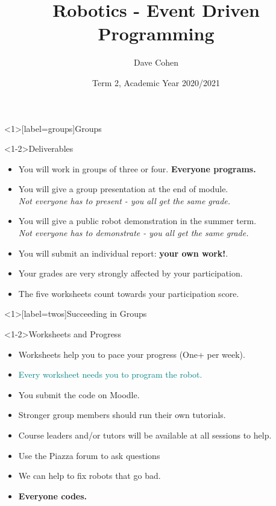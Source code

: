 \documentclass[color=pdftex,usenames,dvipsnames, aspectratio=169]{beamer}
\title{Robotics - Event Driven Programming}
\author{Dave Cohen}
\institute[Comp. Sci., RHUL]{Computer Science, Royal Holloway, University of London}
\date[Term 2, 2020/2021]{Term 2, Academic Year 2020/2021}
\begin{document}
\begin{frame}
  \titlepage
\end{frame}


\begin{frame}<1>[label=groups]{Groups}
\begin{block}<1-2>{Deliverables}
\begin{itemize}
\item You will work in groups of three or four.
\textbf{Everyone programs.}
\item You will give a group presentation at the end of module.\\
\textit{Not everyone has to present - you all get the same grade.}
\item You will give a public robot demonstration in the summer term.\\
\textit{Not everyone has to demonstrate - you all get the same grade.}
\item You will submit an individual report: \textbf{your own work!}.\\
\item Your grades are very strongly affected by your participation.\\
\item The five worksheets count towards your participation score.
\end{itemize}
\end{block}
\end{frame}
\begin{frame}<1>[label=twos]{Succeeding in Groups}
\begin{block}<1-2>{Worksheets and Progress}
\begin{itemize}
\item \textcolor{OliveGreen}{Worksheets help you to pace your progress (One+ per week).}
\item \textcolor{teal}{Every worksheet needs you to program the robot.} 
\item \alert{You submit the code on Moodle.}
\item \textcolor{RedOrange}{Stronger group members should run their own tutorials.}
\item Course leaders and/or tutors will be available at all sessions to help.
\item \textcolor{RedOrange}{Use the Piazza forum to ask questions}
\item \textcolor{OliveGreen}{We can help to fix robots that go bad.}
\item \textbf{Everyone codes.}
\end{itemize}
\end{block}
\end{frame}
\end{document}

